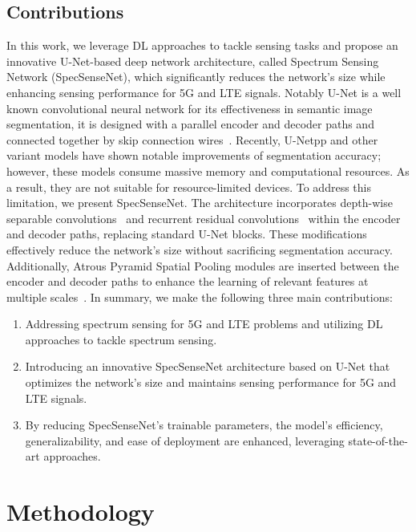 \documentclass[conference]{IEEEtran} %
\begin{document}
\subsection{Contributions}
In this work, we leverage DL approaches to tackle sensing tasks and propose an innovative U-Net-based deep network architecture, called Spectrum Sensing Network (SpecSenseNet), which significantly reduces the network's size while enhancing sensing performance for 5G and LTE signals. 
Notably U-Net is a well known convolutional neural network for its effectiveness in semantic image segmentation, it is designed with a parallel encoder and decoder paths and connected together by skip connection wires~\cite{ronneberger2015u}. Recently, U-Netpp and other variant models\cite{zhou2019unet++} have shown notable improvements of segmentation accuracy; however, these models consume massive memory and computational resources. 
As a result, they are not suitable for resource-limited devices. 
To address this limitation, we present SpecSenseNet. The architecture incorporates depth-wise separable convolutions~\cite{CholletXception} and recurrent residual convolutions~\cite{AlomNuclei, he2016deep, aghalari2021brain} within the encoder and decoder paths, replacing standard U-Net blocks. These modifications effectively reduce the network's size without sacrificing segmentation accuracy. Additionally, Atrous Pyramid Spatial Pooling modules are inserted between the encoder and decoder paths to enhance the learning of relevant features at multiple scales~\cite{ChenAtrous}.
In summary, we make the following three main contributions:
\begin{enumerate}
\item Addressing spectrum sensing for 5G and LTE problems and utilizing DL approaches to tackle spectrum sensing.
\item Introducing an innovative SpecSenseNet architecture based on U-Net that optimizes the network's size and maintains sensing performance for 5G and LTE signals.
\item By reducing SpecSenseNet's trainable parameters, the model's efficiency, generalizability, and ease of deployment are enhanced, leveraging state-of-the-art approaches.
\end{enumerate}


\section{Methodology}
\end{document}
